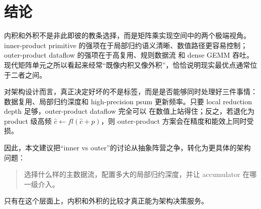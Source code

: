 \documentclass[UTF8,11pt,a4paper]{ctexart}
\begin{document}
\section{结论}

内积和外积不是非此即彼的教条选择，而是矩阵乘实现空间中的两个极端视角。inner-product primitive
的强项在于局部归约语义清晰、数值路径更容易控制；outer-product dataflow 的强项在于高复用、规则数据流
和 dense GEMM 吞吐。现代矩阵单元之所以看起来经常“既像内积又像外积”，恰恰说明现实最优点通常位于二者之间。

对架构设计而言，真正决定好坏的不是标签，而是是否能够同时处理好三件事情：数据复用、局部归约深度和
high-precision psum 更新频率。只要 local reduction depth 足够，outer-product dataflow 完全可以
在数值上站得住；反之，若退化为 product 级高频 $\hat{c}\leftarrow fl(\hat{c}+p)$，则 outer-product
方案会在精度和能效上同时受损。

因此，本文建议把“inner vs outer”的讨论从抽象阵营之争，转化为更具体的架构问题：
\begin{quote}
  选择什么样的主数据流，配置多大的局部归约深度，并让 accumulator 在哪一级介入。
\end{quote}
只有在这个层面上，内积和外积的比较才真正能为架构决策服务。
\end{document}
